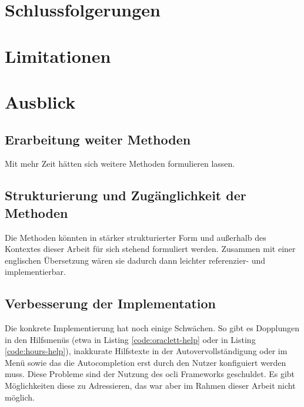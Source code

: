 \documentclass[oneside,bibliography=totocnumbered,BCOR=5mm]{scrbook}
\begin{document}
\section{Schlussfolgerungen}
\section{Limitationen}
\section{Ausblick}

\subsection{Erarbeitung weiter Methoden}

Mit mehr Zeit hätten sich weitere Methoden formulieren lassen.

\subsection{Strukturierung und Zugänglichkeit der Methoden}

Die Methoden könnten in stärker strukturierter Form und außerhalb des Kontextes
dieser Arbeit für sich stehend formuliert werden. Zusammen mit einer englischen
Übersetzung wären sie dadurch dann leichter referenzier- und implementierbar.

\subsection{Verbesserung der Implementation}

Die konkrete Implementierung hat noch einige Schwächen. So gibt es Dopplungen in
den Hilfsmenüs (etwa  in Listing \ref{code:oraclett-help}
oder  in Listing \ref{code:hours-help}), inakkurate
Hilfstexte in der Autovervollständigung oder im 
Menü sowie das die Autocompletion erst durch den Nutzer konfiguiert werden
muss. Diese Probleme sind der Nutzung des ocli Frameworks geschuldet. Es gibt
Möglichkeiten diese zu Adressieren, das war aber im Rahmen dieser Arbeit nicht
möglich.
\end{document}
